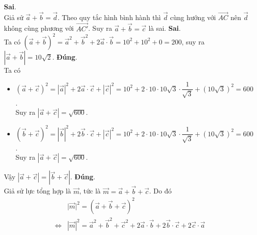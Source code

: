 \begin{ex}
{        \begin{itemchoice}
            \itemch \textbf{Sai}.\\
            Giả sử $\overrightarrow{a}+\overrightarrow{b}=\overrightarrow{d}$. Theo quy tắc hình bình hành thì $\overrightarrow{d}$ cùng hướng với $\overrightarrow{AC}$ nên $\overrightarrow{d}$ không cùng phương với $\overrightarrow{AC'}$. Suy ra $\overrightarrow{a}+\overrightarrow{b}=\overrightarrow{c}$ là sai.
            \itemch \textbf{Sai}.\\
            Ta có $\left( \overrightarrow{a} + \overrightarrow{b}\right)^2 = {\overrightarrow{a}}^2 + {\overrightarrow{b}}^2 + 2\overrightarrow{a}\cdot \overrightarrow{b} = 10^2+10^2+0 =200$, suy ra $\left|\overrightarrow{a}+\overrightarrow{b}\right|=10\sqrt{2}$.
            \itemch \textbf{Đúng}.\\
            Ta có \begin{itemize}
                \item $\left(\overrightarrow{a}+\overrightarrow{c}\right)^2=\left|\overrightarrow{a}\right|^2+2\overrightarrow{a}\cdot\overrightarrow{c}+\left|\overrightarrow{c}\right|^2=10^2+2\cdot 10\cdot 10\sqrt{3}\cdot\dfrac{1}{\sqrt{3}}+\left(10\sqrt{3}\right)^2=600$.\\
                Suy ra $\left|\overrightarrow{a}+\overrightarrow{c}\right|=\sqrt{600}$.
                \item $\left(\overrightarrow{b}+\overrightarrow{c}\right)^2=\left|\overrightarrow{b}\right|^2+2\overrightarrow{b}\cdot\overrightarrow{c}+\left|\overrightarrow{c}\right|^2=10^2+2\cdot 10\cdot 10\sqrt{3}\cdot\dfrac{1}{\sqrt{3}}+\left(10\sqrt{3}\right)^2=600$.\\
                Suy ra $\left|\overrightarrow{a}+\overrightarrow{c}\right|=\sqrt{600}$.
            \end{itemize}
            Vậy $\left|\overrightarrow{a}+\overrightarrow{c}\right|=\left|\overrightarrow{b}+\overrightarrow{c}\right|$.
            \itemch \textbf{Đúng}.\\
            Giả sử lực tổng hợp là $\overrightarrow{m}$, tức là $\overrightarrow{m}=\overrightarrow{a}+\overrightarrow{b}+\overrightarrow{c}$. Do đó
            \begin{eqnarray*}
                && \big|\overrightarrow{m}\big|^2=\left(\overrightarrow{a}+\overrightarrow{b}+\overrightarrow{c}\right)^2\\
                &\Leftrightarrow& \left|\overrightarrow{m}\right|^2={\overrightarrow{a}}^2+{\overrightarrow{b}}^2+{\overrightarrow{c}}^2+2\overrightarrow{a}\cdot\overrightarrow{b}+2\overrightarrow{b}\cdot\overrightarrow{c}+2\overrightarrow{c}\cdot\overrightarrow{a}\\

\end{eqnarray*}
\end{itemchoice}}
\end{ex}
